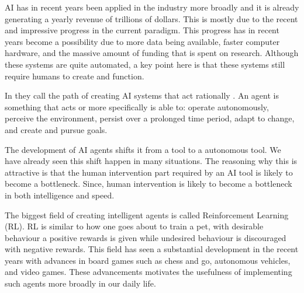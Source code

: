 \documentclass[12pt,A4]{report}
\theoremstyle{definition}
\begin{document}
AI has in recent years been applied in the industry more broadly and it is already generating a yearly revenue of trillions of dollars\autocite{Russel Norvig}. This is mostly due to the recent and impressive progress in the current paradigm. This progress has in recent years become a possibility due to more data being available, faster computer hardware, and the massive amount of funding that is spent on research. Although these systems are quite automated, a key point here is that these systems still require humans to create and function.

In \autocite{Russel Norvig} they call the path of creating AI systems that act rationally . An agent is something that acts or more specifically is able to: operate autonomously, perceive the environment, persist over a prolonged time period, adapt to change, and create and pursue goals.

The development of AI agents shifts it from a tool to a autonomous tool. We have already seen this shift happen in many situations\autocite{k'lla}. The reasoning why this is attractive is that the human intervention part required by an AI tool is likely to become a bottleneck\autocite{T'nkande Maskiner}. Since, human intervention is likely to become a bottleneck in both intelligence and speed.

The biggest field of creating intelligent agents is called Reinforcement Learning (RL). RL is similar to how one goes about to train a pet, with desirable behaviour a positive rewards is given while undesired behaviour is discouraged with negative rewards. This field has seen a substantial development in the recent years with advances in board games such as chess and go\autocite{Silver et al.}, autonomous vehicles\autocite{Levinson et al.}, and video games\autocite{Minh et al.}. These advancements motivates the usefulness of implementing such agents more broadly in our daily life.
\end{document}

